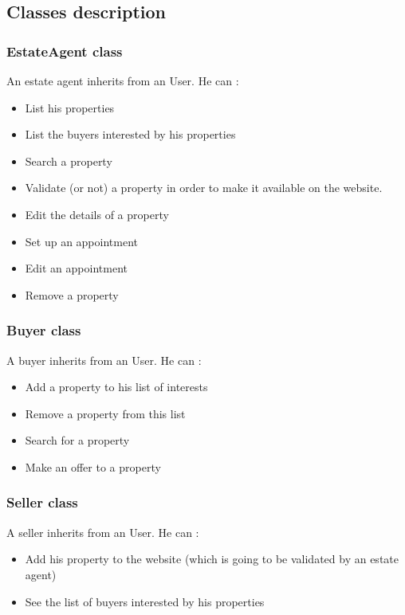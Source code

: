 \documentclass[a4paper,12pt]{article}
\begin{document}
\subsection {Classes description}

\subsubsection{EstateAgent class}
An estate agent inherits from an User.
He can :
\begin{itemize}
\item List his properties
\item List the buyers interested by his properties
\item Search a property
\item Validate (or not) a property in order to make it available on the website.
\item Edit the details of a property
\item Set up an appointment
\item Edit an appointment
\item Remove a property
\end{itemize}

\subsubsection{Buyer class}
A buyer inherits from an User.
He can :
\begin{itemize}
\item Add a property to his list of interests
\item Remove a property from this list
\item Search for a property
\item Make an offer to a property
\end{itemize}

\subsubsection{Seller class}
A seller inherits from an User.
He can :
\begin{itemize}
\item Add his property to the website (which is going to be validated by an estate agent)
\item See the list of buyers interested by his properties
\end{itemize}
\end{document}
